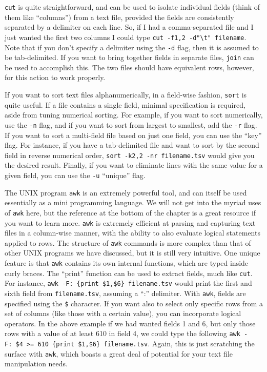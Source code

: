 \documentclass[
]{book}
\begin{document}
\texttt{cut} is quite straightforward, and can be used to isolate individual fields (think of them like ``columns'') from a text file, provided the fields are consistently separated by a delimiter on each line. So, if I had a comma-separated file and I just wanted the first two columns I could type \texttt{cut\ -f1,2\ -d"\textbackslash{}t"\ filename}. Note that if you don't specify a delimiter using the \texttt{-d} flag, then it is assumed to be tab-delimited. If you want to bring together fields in separate files, \texttt{join} can be used to accomplish this. The two files should have equivalent rows, however, for this action to work properly.

If you want to sort text files alphanumerically, in a field-wise fashion, \texttt{sort} is quite useful. If a file contains a single field, minimal specification is required, aside from tuning numerical sorting. For example, if you want to sort numerically, use the \texttt{-n} flag, and if you want to sort from largest to smallest, add the \texttt{-r} flag. If you want to sort a multi-field file based on just one field, you can use the ``key'' flag. For instance, if you have a tab-delimited file and want to sort by the second field in reverse numerical order, \texttt{sort\ -k2,2\ -nr\ filename.tsv} would give you the desired result. Finally, if you want to eliminate lines with the same value for a given field, you can use the \texttt{-u} ``unique'' flag.

The UNIX program \texttt{awk} is an extremely powerful tool, and can itself be used essentially as a mini programming language. We will not get into the myriad uses of \texttt{awk} here, but the reference at the bottom of the chapter is a great resource if you want to learn more. \texttt{awk} is extremely efficient at parsing and capturing text files in a column-wise manner, with the ability to also evaluate logical statements applied to rows. The structure of \texttt{awk} commands is more complex than that of other UNIX programs we have discussed, but it is still very intuitive. One unique feature is that \texttt{awk} contains its own internal functions, which are typed inside curly braces. The ``print'' function can be used to extract fields, much like \texttt{cut}. For instance, \texttt{awk\ -F:\ \textquotesingle{}\{print\ \$1,\$6\}\textquotesingle{}\ filename.tsv} would print the first and sixth field from \texttt{filename.tsv}, assuming a ``:'' delimiter. With \texttt{awk}, fields are specified using the \texttt{\$} character. If you want also to select only specific rows from a set of columns (like those with a certain value), you can incorporate logical operators. In the above example if we had wanted fields 1 and 6, but only those rows with a value of at least 610 in field 4, we could type the following \texttt{awk\ -F:\ \textquotesingle{}\$4\ \textgreater{}=\ 610\ \{print\ \$1,\$6\}\textquotesingle{}\ filename.tsv}. Again, this is just scratching the surface with \texttt{awk}, which boasts a great deal of potential for your text file manipulation needs.
\end{document}
